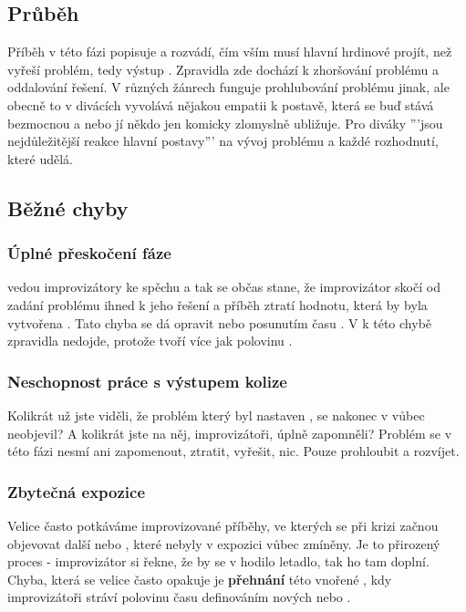  
\subsection{ Průběh } Příběh v této fázi popisuje a rozvádí, čím vším musí hlavní hrdinové projít, než vyřeší problém, tedy výstup . Zpravidla zde dochází k zhoršování problému a oddalování řešení. V různých žánrech funguje prohlubování problému jinak, ale obecně to v divácích vyvolává nějakou empatii k postavě, která se buď stává bezmocnou a nebo jí někdo jen komicky zlomyslně ubližuje. Pro diváky '''jsou nejdůležitější reakce hlavní postavy''' na vývoj problému a každé rozhodnutí, které udělá.  
 
 
\subsection{ Běžné chyby }  
\subsubsection{ Úplné přeskočení fáze }  vedou improvizátory ke spěchu a tak se občas stane, že improvizátor skočí od zadání problému ihned k jeho řešení a příběh ztratí hodnotu, která by byla vytvořena . Tato chyba se dá opravit  nebo posunutím času . V  k této chybě zpravidla nedojde, protože  tvoří více jak polovinu . 
 
\subsubsection{ Neschopnost práce s výstupem kolize } Kolikrát už jste viděli, že problém který byl nastaven , se nakonec v  vůbec neobjevil? A kolikrát jste na něj, improvizátoři, úplně zapomněli? Problém se v této fázi nesmí ani zapomenout, ztratit, vyřešit, nic. Pouze prohloubit a rozvíjet. 
 
\subsubsection{ Zbytečná expozice } Velice často potkáváme improvizované příběhy, ve kterých se při krizi začnou objevovat další  nebo , které nebyly v expozici vůbec zmíněny. Je to přirozený proces - improvizátor si řekne, že by se v  hodilo letadlo, tak ho tam doplní. Chyba, která se velice často opakuje je \textbf{přehnání}{} této vnořené , kdy improvizátoři stráví polovinu času  definováním nových  nebo . 
 
